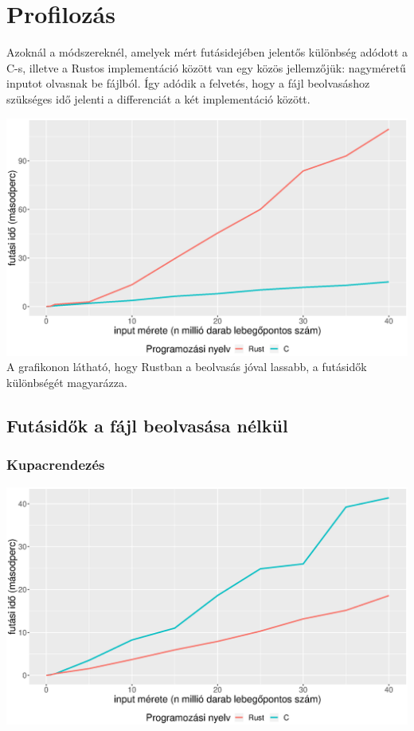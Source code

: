 
\section{Profilozás}
Azoknál a módszereknél, amelyek mért futásidejében jelentős különbség adódott a C-s, illetve a Rustos implementáció között van egy közös jellemzőjük: nagyméretű inputot olvasnak be fájlból. Így adódik a felvetés, hogy a fájl beolvasáshoz szükséges idő jelenti a differenciát a két implementáció között.

\includegraphics[width=15.5cm]{kepek/file_read.eps}
A grafikonon látható, hogy Rustban a beolvasás jóval lassabb, a futásidők különbségét magyarázza.

\subsection{Futásidők a fájl beolvasása nélkül}

\subsubsection{Kupacrendezés}
\includegraphics[width=15.5cm]{kepek/heap_sort_run_without_read.eps}

